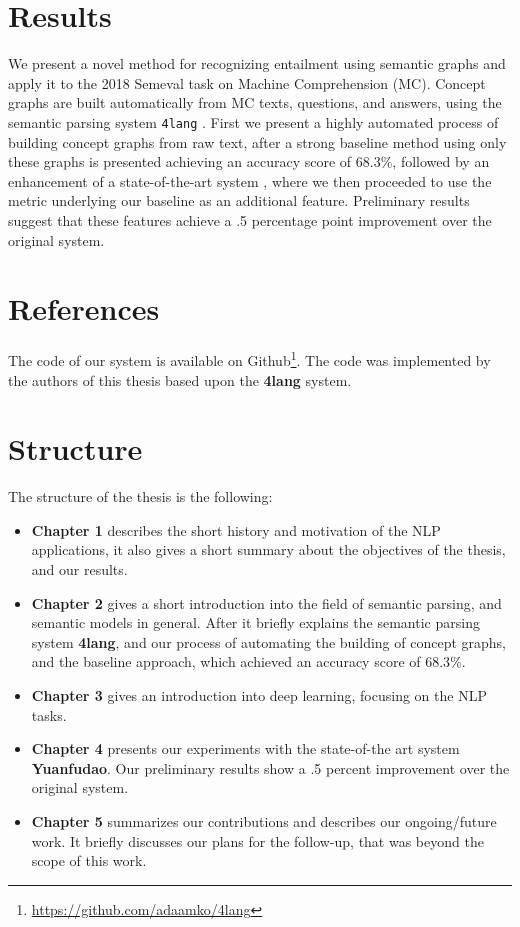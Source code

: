 \section{Results}
We present a novel method for recognizing entailment using semantic
graphs and apply it to the 2018 Semeval task on Machine
Comprehension (MC).
Concept graphs are built automatically from MC texts, questions, and answers,
using the semantic parsing system \texttt{4lang} \cite{Recski:2016d}.
First we present a highly automated process of building concept graphs from raw text, after
a strong baseline method using only these graphs is presented achieving an accuracy score of $68.3\%$,
followed by an enhancement of a state-of-the-art system
\cite{Wang:2018}, where we then proceeded to use the metric underlying our baseline as an
additional feature. Preliminary results suggest that these features
achieve a .5 percentage point improvement over the original system.

\section{References}
The code of our system is available on Github\footnote{\url{https://github.com/adaamko/4lang}}. The code was implemented by the authors of this thesis based upon the \textbf{4lang} system.

\section{Structure}
The structure of the thesis is the following:
\begin{itemize}
	\item \textbf{Chapter 1} describes the short history and motivation of the NLP applications, it also gives a short summary about the objectives of the thesis, and our results.
	\item \textbf{Chapter 2} gives a short introduction into the field of semantic parsing, and semantic models in general. After it briefly explains the semantic parsing system \textbf{4lang}, and our process of automating the building of concept graphs, and the baseline approach, which achieved an accuracy score of $68.3\%$.
	\item \textbf{Chapter 3} gives an introduction into deep learning, focusing on the NLP tasks.
	\item \textbf{Chapter 4} presents our experiments with the state-of-the art system \textbf{Yuanfudao}. Our preliminary results show a .5 percent improvement over the original system.
	\item \textbf{Chapter 5} summarizes our contributions and describes our ongoing/future work. It briefly discusses our plans for the follow-up, that was beyond the scope of this work.
\end{itemize}